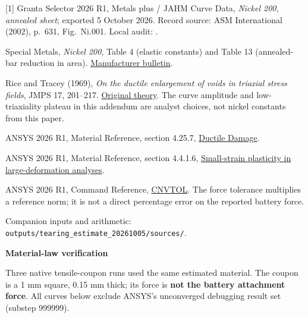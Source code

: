 \documentclass[10pt,a4paper]{article}
\newcommand{\ReportHeading}[1]{\par\vspace{6pt}{\large\bfseries\color{Teal}#1}\par\vspace{3pt}}
\newcommand{\PageTitle}[1]{{\LARGE\bfseries\color{Navy}#1\par}\vspace{7pt}}
\begin{document}
\ReportHeading{Sources and provenance}
{\small
[1] Granta Selector 2026 R1, Metals plus / JAHM Curve Data, \emph{Nickel 200, annealed sheet}; exported 5 October 2026. Record source: ASM International (2002), p.~631, Fig.~Ni.001. Local audit:
.\par
[2] Special Metals, \emph{Nickel 200}, Table 4 (elastic constants) and Table 13 (annealed-bar reduction in area). \href{https://www.specialmetals.com/documents/technical-bulletins/nickel-200.pdf}{Manufacturer bulletin}.\par
[3] Rice and Tracey (1969), \emph{On the ductile enlargement of voids in triaxial stress fields}, JMPS 17, 201--217. \href{https://doi.org/10.1016/0022-5096(69)90033-7}{Original theory}. The curve amplitude and low-triaxiality plateau in this addendum are analyst choices, not nickel constants from this paper.\par
[4] ANSYS 2026 R1, Material Reference, section 4.25.7, \href{https://ansyshelp.ansys.com/public/Views/Secured/corp/v261/en/ans_mat/mat_damageall.html}{Ductile Damage}.\par
[5] ANSYS 2026 R1, Material Reference, section 4.4.1.6, \href{https://ansyshelp.ansys.com/public/Views/Secured/corp/v261/en/ans_mat/amp8sq21dldm.html}{Small-strain plasticity in large-deformation analyses}.\par
[6] ANSYS 2026 R1, Command Reference, \href{https://ansyshelp.ansys.com/public/Views/Secured/corp/v261/en/ans_cmd/Hlp_C_CNVTOL.html}{CNVTOL}. The force tolerance multiplies a reference norm; it is not a direct percentage error on the reported battery force.\par
Companion inputs and arithmetic:
\texttt{outputs/tearing\_estimate\_20261005/sources/}.\par
}
\clearpage
\PageTitle{Material-law verification}
Three native tensile-coupon runs used the same estimated material. The coupon is a 1 mm square, 0.15 mm thick; its force is \textbf{not the battery attachment force}. All curves below exclude ANSYS's unconverged debugging result set (substep 999999).
\end{document}
